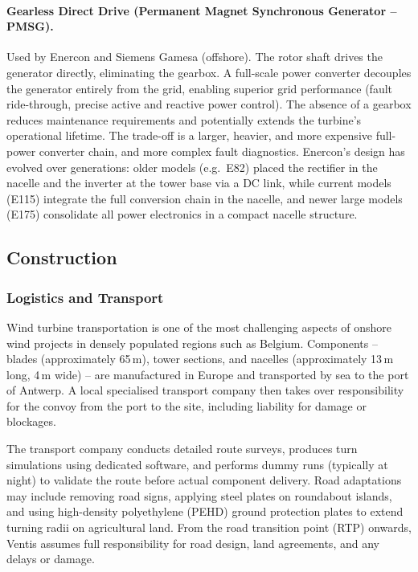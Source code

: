 \paragraph{Gearless Direct Drive (Permanent Magnet Synchronous Generator -- PMSG).}
Used by Enercon and Siemens Gamesa (offshore). The rotor shaft drives the generator directly,
eliminating the gearbox. A full-scale power converter decouples the generator entirely from
the grid, enabling superior grid performance (fault ride-through, precise active and reactive
power control). The absence of a gearbox reduces maintenance requirements and potentially
extends the turbine's operational lifetime. The trade-off is a larger, heavier, and more
expensive full-power converter chain, and more complex fault diagnostics. Enercon's design
has evolved over generations: older models (e.g.\ E82) placed the rectifier in the nacelle
and the inverter at the tower base via a DC link, while current models (E115) integrate the
full conversion chain in the nacelle, and newer large models (E175) consolidate all power
electronics in a compact nacelle structure.

\subsection{Construction}

\subsubsection{Logistics and Transport}

Wind turbine transportation is one of the most challenging aspects of onshore wind projects
in densely populated regions such as Belgium. Components -- blades (approximately 65\,m),
tower sections, and nacelles (approximately 13\,m long, 4\,m wide) -- are manufactured in
Europe and transported by sea to the port of Antwerp. A local specialised transport company
then takes over responsibility for the convoy from the port to the site, including liability
for damage or blockages.

The transport company conducts detailed route surveys, produces turn simulations using
dedicated software, and performs dummy runs (typically at night) to validate the route before
actual component delivery. Road adaptations may include removing road signs, applying steel
plates on roundabout islands, and using high-density polyethylene (PEHD) ground protection
plates to extend turning radii on agricultural land. From the road transition point (RTP)
onwards, Ventis assumes full responsibility for road design, land agreements, and any delays
or damage.

